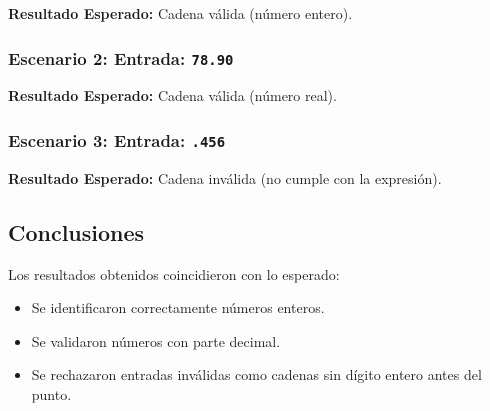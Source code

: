 \documentclass{article}
\begin{document}
\textbf{Resultado Esperado:} Cadena válida (número entero).

\subsubsection{Escenario 2: Entrada: \texttt{78.90}}

\textbf{Resultado Esperado:} Cadena válida (número real).

\subsubsection{Escenario 3: Entrada: \texttt{.456}}

\textbf{Resultado Esperado:} Cadena inválida (no cumple con la expresión).

\subsection{Conclusiones}

Los resultados obtenidos coincidieron con lo esperado:
\begin{itemize}
    \item Se identificaron correctamente números enteros.
    \item Se validaron números con parte decimal.
    \item Se rechazaron entradas inválidas como cadenas sin dígito entero antes del punto.
\end{itemize}
\end{document}
